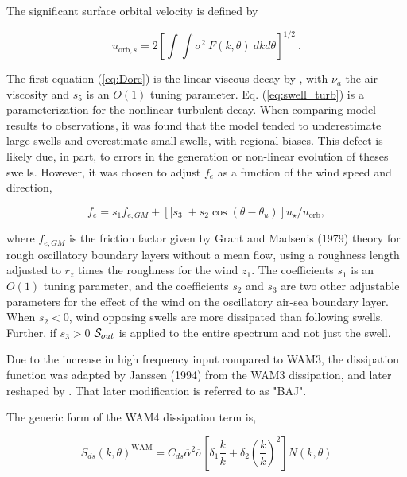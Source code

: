 \noindent
The significant surface orbital velocity is defined by

\begin{equation} u_{\mathrm{orb},s} = 2 \left [  \int \!\!\!\! \int
      \sigma^2 \: F(k,\theta) \: dk d\theta \right ] ^{1/2}
      \: . \label{eq:ub_orbs} \end{equation}

\noindent
The first equation (\ref{eq:Dore}) is the linear viscous decay by
\cite{art:Dore78}, with $\nu_a$ the air viscosity and $s_5$ is an $O(1)$
tuning parameter. Eq. (\ref{eq:swell_turb}) is a parameterization for the
nonlinear turbulent decay. When comparing model results to observations, it
was found that the model tended to underestimate large swells and overestimate
small swells, with regional biases. This defect is likely due, in part, to
errors in the generation or non-linear evolution of theses swells. However, it
was chosen to adjust $f_e$ as a function of the wind speed and direction,

\begin{equation}
f_e = s_1 f_{e,GM} + \left[\left|s_3\right| + s_2 \cos
(\theta-\theta_u)\right]u_\star / u_{\mathrm{orb}},\label{fevar}
\end{equation}

\noindent
where $f_{e,GM}$ is the friction factor given by Grant and Madsen's
(1979)\nocite{art:GM79} theory for rough oscillatory boundary layers without a
mean flow, using a roughness length adjusted to $r_z$ times the roughness for
the wind $z_1$. The coefficients $s_1$ is an $O(1)$ tuning parameter, and the
coefficients $s_2$ and $s_3$ are two other adjustable parameters for the
effect of the wind on the oscillatory air-sea boundary layer. When $s_2 < 0$,
wind opposing swells are more dissipated than following swells. Further, if
$s_3 > 0$ ${\cal S}_{out}$ is applied to the entire spectrum and not just the
swell.

Due to the increase in high frequency input compared to WAM3, the dissipation
function was adapted by Janssen (1994) from the WAM3 dissipation, and later
reshaped by \cite{rep:Bea05}. That later modification is referred to as "BAJ".

\noindent
The generic form of the WAM4 dissipation term is,

\begin{equation}
S_{ds}\left(k,\theta\right)^{\mathrm{WAM}} = C_{ds} \overline{\alpha}^2
 \overline{\sigma} \left[\delta_1 \frac{k}{\overline{k}} + \delta_2
\left(\frac{k}{\overline{k}}\right)^2\right]\label{eq:SdsWAM4}
N\left(k,\theta\right)
\end{equation}

